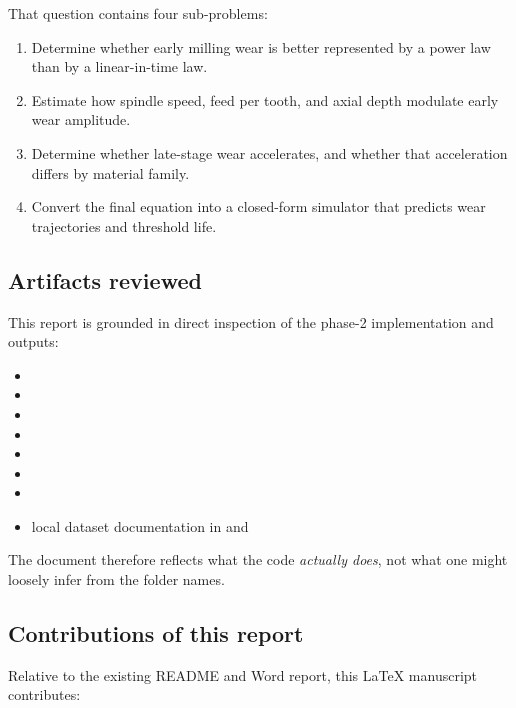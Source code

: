 \documentclass[11pt,a4paper]{article}
\begin{document}
That question contains four sub-problems:

\begin{enumerate}[leftmargin=1.8em]
\item Determine whether early milling wear is better represented by a power law than by a linear-in-time law.
\item Estimate how spindle speed, feed per tooth, and axial depth modulate early wear amplitude.
\item Determine whether late-stage wear accelerates, and whether that acceleration differs by material family.
\item Convert the final equation into a closed-form simulator that predicts wear trajectories and threshold life.
\end{enumerate}

\subsection{Artifacts reviewed}

This report is grounded in direct inspection of the phase-2 implementation and outputs:

\begin{itemize}[leftmargin=1.6em]
\item {}
\item {}
\item {}
\item {}
\item {}
\item {}
\item {}
\item local dataset documentation in  and 
\end{itemize}

The document therefore reflects what the code \emph{actually does}, not what one might loosely infer from the
folder names.

\subsection{Contributions of this report}

Relative to the existing README and Word report, this LaTeX manuscript contributes:
\end{document}
